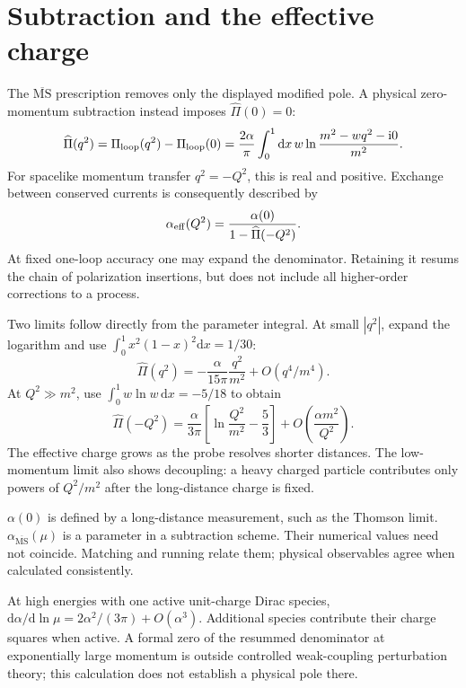 \documentclass[11pt]{article}
\newcommand{\dd}{\mathrm d}
\newcommand{\ii}{\mathrm i}
\newcommand{\MSbar}{\overline{\mathrm{MS}}}
\newcommand{\module}[1]{\clearpage\section{#1}}
\begin{document}
\module{Subtraction and the effective charge}
The \(\MSbar\) prescription removes only the displayed modified pole.
A physical zero-momentum subtraction instead imposes \(\widehat\Pi(0)=0\):
\begin{equation}
 \widehat\Pi(q^2)=\Pi_{\rm loop}(q^2)-\Pi_{\rm loop}(0)
 =\frac{2\alpha}{\pi}\int_0^1\dd x\,w
 \ln\frac{m^2-wq^2-\ii0}{m^2}.
 \label{eq:pihat}
\end{equation}
For spacelike momentum transfer \(q^2=-Q^2\), this is real and positive.
Exchange between conserved currents is consequently described by
\begin{equation}
 \alpha_{\rm eff}(Q^2)=\frac{\alpha(0)}{1-\widehat\Pi(-Q^2)}.
 \label{eq:alphaeff}
\end{equation}
At fixed one-loop accuracy one may expand the denominator. Retaining it
resums the chain of polarization insertions, but does not include all
higher-order corrections to a process.

Two limits follow directly from the parameter integral. At small
\(|q^2|\), expand the logarithm and use
\(\int_0^1x^2(1-x)^2\dd x=1/30\):
\begin{equation}
 \widehat\Pi(q^2)=-\frac{\alpha}{15\pi}\frac{q^2}{m^2}
 +O(q^4/m^4).
\end{equation}
At \(Q^2\gg m^2\), use
\(\int_0^1w\ln w\,\dd x=-5/18\) to obtain
\begin{equation}
 \widehat\Pi(-Q^2)=\frac{\alpha}{3\pi}
 \left[\ln\frac{Q^2}{m^2}-\frac53\right]
 +O\!\left(\frac{\alpha m^2}{Q^2}\right).
\end{equation}
The effective charge grows as the probe resolves shorter distances.
The low-momentum limit also shows decoupling: a heavy charged particle
contributes only powers of \(Q^2/m^2\) after the long-distance charge is fixed.

\begin{keyidea}
\(\alpha(0)\) is defined by a long-distance measurement, such as the
Thomson limit. \(\alpha_{\MSbar}(\mu)\) is a parameter in a subtraction
scheme. Their numerical values need not coincide. Matching and running
relate them; physical observables agree when calculated consistently.
\end{keyidea}
At high energies with one active unit-charge Dirac species,
\(\dd\alpha/\dd\ln\mu=2\alpha^2/(3\pi)+O(\alpha^3)\).
Additional species contribute their charge squares when active. A
formal zero of the resummed denominator at exponentially large momentum
is outside controlled weak-coupling perturbation theory; this calculation
does not establish a physical pole there.
\end{document}
